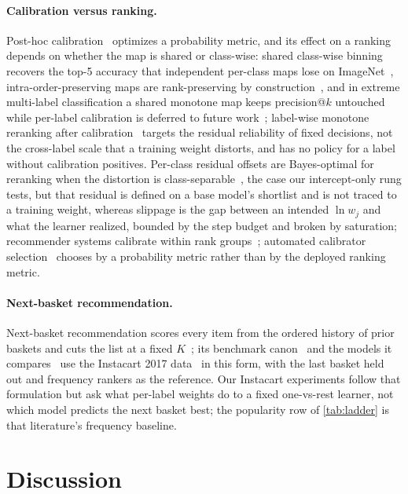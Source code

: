 \documentclass[sigconf,nonacm]{acmart}
\begin{document}
\paragraph{Calibration versus ranking.} Post-hoc calibration~\cite{Platt1999,Zadrozny2002,NiculescuMizil2005,Kull2017Beta,Guo2017Calibration} optimizes a probability metric, and its effect on a ranking depends on whether the map is shared or class-wise: shared class-wise binning recovers the top-5 accuracy that independent per-class maps lose on ImageNet~\cite{Patel2021IMax}, intra-order-preserving maps are rank-preserving by construction~\cite{Rahimi2020IntraOrder}, and in extreme multi-label classification a shared monotone map keeps precision@$k$ untouched while per-label calibration is deferred to future work~\cite{Ullah2025XMLCCalib}; label-wise monotone reranking after calibration~\cite{Tae2026MRP} targets the residual reliability of fixed decisions, not the cross-label scale that a training weight distorts, and has no policy for a label without calibration positives. Per-class residual offsets are Bayes-optimal for reranking when the distortion is class-separable~\cite{Wang2026BeyondLA}, the case our intercept-only rung tests, but that residual is defined on a base model's shortlist and is not traced to a training weight, whereas slippage is the gap between an intended $\ln w_j$ and what the learner realized, bounded by the step budget and broken by saturation; recommender systems calibrate within rank groups~\cite{Sato2024TopN}; automated calibrator selection~\cite{Abdelrahman2025SmartCal} chooses by a probability metric rather than by the deployed ranking metric.

\paragraph{Next-basket recommendation.} Next-basket recommendation scores every item from the ordered history of prior baskets and cuts the list at a fixed $K$~\cite{Yu2016DREAM}; its benchmark canon~\cite{Li2023NBRRealityCheck} and the models it compares~\cite{Hu2020TIFUKNN,Ariannezhad2022ReCANet} use the Instacart 2017 data~\cite{Instacart2017} in this form, with the last basket held out and frequency rankers as the reference. Our Instacart experiments follow that formulation but ask what per-label weights do to a fixed one-vs-rest learner, not which model predicts the next basket best; the popularity row of \cref{tab:ladder} is that literature's frequency baseline.

\section{Discussion}
\label{sec:discussion}
\end{document}
